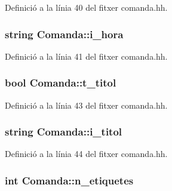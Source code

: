 Definició a la línia 40 del fitxer comanda.\+hh.

\hypertarget{class_comanda_a480a34460b3668a5b4a1fa7e796632db}{}
\subsubsection[{i\+\_\+hora}]{\setlength{\rightskip}{0pt plus 5cm}string Comanda\+::i\+\_\+hora\hspace{0.3cm}{\ttfamily [private]}}\label{class_comanda_a480a34460b3668a5b4a1fa7e796632db}


Definició a la línia 41 del fitxer comanda.\+hh.

\hypertarget{class_comanda_a08e8674396e2125cf8b2900f289713a7}{}
\subsubsection[{t\+\_\+titol}]{\setlength{\rightskip}{0pt plus 5cm}bool Comanda\+::t\+\_\+titol\hspace{0.3cm}{\ttfamily [private]}}\label{class_comanda_a08e8674396e2125cf8b2900f289713a7}


Definició a la línia 43 del fitxer comanda.\+hh.

\hypertarget{class_comanda_aca04e90eab5ac14ddc3b25f154aabe48}{}
\subsubsection[{i\+\_\+titol}]{\setlength{\rightskip}{0pt plus 5cm}string Comanda\+::i\+\_\+titol\hspace{0.3cm}{\ttfamily [private]}}\label{class_comanda_aca04e90eab5ac14ddc3b25f154aabe48}


Definició a la línia 44 del fitxer comanda.\+hh.

\hypertarget{class_comanda_a1e525815f0745140e05da2ebb96ec39a}{}
\subsubsection[{n\+\_\+etiquetes}]{\setlength{\rightskip}{0pt plus 5cm}int Comanda\+::n\+\_\+etiquetes\hspace{0.3cm}{\ttfamily [private]}}\label{class_comanda_a1e525815f0745140e05da2ebb96ec39a}


